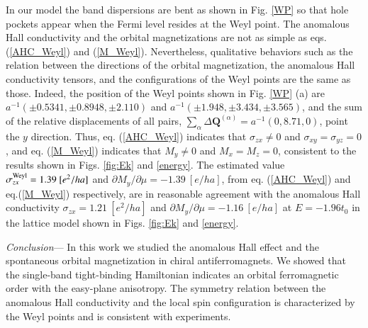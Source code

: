 \documentclass[letter,twocolumn,amsmath,amssymb,superscriptaddress]{jpsj3}
\newcommand{\vk}{\bm{k}}
\newcommand{\vQ}{\bm{Q}}
\begin{document}
In our model the band dispersions are bent as shown in Fig. \ref{WP} so that hole pockets appear when the Fermi level resides at the Weyl point. The anomalous Hall conductivity and the orbital magnetizations are not as simple as eqs. (\ref{AHC_Weyl}) and (\ref{M_Weyl}). Nevertheless, qualitative behaviors such as the relation between the directions of the orbital magnetization, the anomalous Hall conductivity tensors, and the configurations of the Weyl points are the same as those.
Indeed, the position of the Weyl points shown in Fig. \ref{WP} (a) are $a^{-1}(\pm0.5341,\pm0.8948,\pm2.110)$ and $a^{-1}(\pm1.948,\pm3.434,\pm3.565)$, and the sum of the relative displacements of all pairs, $\sum_{\alpha}\Delta\vQ^{(\alpha)}=a^{-1}(0,8.71,0)$, point the $y$ direction. Thus, eq. (\ref{AHC_Weyl}) indicates that $\sigma_{zx}\ne0$ and $\sigma_{xy}=\sigma_{yz}=0$, and eq. (\ref{M_Weyl}) indicates that $M_y\ne0$ and $M_x=M_z=0$, consistent to the results shown in Figs. \ref{fig:Ek} and \ref{energy}. 
The estimated value $\sigma^{\rm Weyl}_{zx}=1.39\ [e^2/ha]$ and $\partial M_y/\partial \mu=-1.39\ [e/ha]$, from eq. (\ref{AHC_Weyl}) and eq.(\ref{M_Weyl}) respectively,
are in reasonable agreement with the anomalous Hall conductivity $\sigma_{zx}=1.21\ [e^2/ha]$
and $\partial M_y/\partial \mu=-1.16\ [e/ha]$
at $E=-1.96t_0$ in the lattice model shown in Figs. \ref{fig:Ek} and \ref{energy}.







{\it Conclusion}---
In this work we studied the anomalous Hall effect and the spontaneous orbital magnetization in chiral antiferromagnets.
We showed that the single-band tight-binding Hamiltonian indicates an orbital ferromagnetic order with the easy-plane anisotropy.
The symmetry relation between the anomalous Hall conductivity and the local spin configuration is 
characterized by the Weyl points and is consistent with experiments. 
\end{document}
